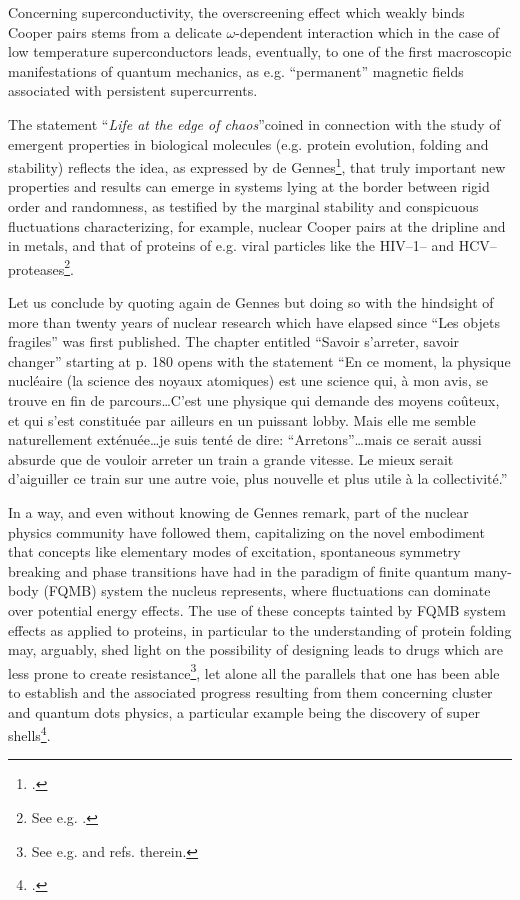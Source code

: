 Concerning superconductivity, the overscreening effect which  weakly binds Cooper pairs stems from a delicate $\omega$-dependent interaction which in the case of low temperature superconductors leads, eventually, to one of the first macroscopic manifestations of quantum mechanics, as e.g. ``permanent'' magnetic fields associated with persistent  supercurrents.

The statement ``\textit{Life at the edge of chaos}''coined in connection with the study of emergent properties in biological molecules (e.g. protein evolution, folding and stability) reflects the idea, as expressed by de Gennes\footnote{\cite{DeGennes:94}.}, that truly important new properties and results can emerge in systems lying at the border between rigid order and randomness, as testified by the marginal stability and conspicuous fluctuations characterizing, for example, nuclear Cooper pairs at the dripline and in metals, and that of proteins of e.g.  viral particles like the HIV--1-- and HCV--proteases\footnote{See e.g. \cite{Broglia:13b}.}.


 Let us conclude by quoting again de Gennes but doing so with the hindsight of more than twenty years of nuclear research which have elapsed since ``Les objets fragiles'' was first published. The chapter entitled  ``Savoir s'arreter, savoir changer'' starting at p. 180 opens with the statement ``En ce moment, la physique nucl\'eaire (la science des noyaux atomiques) est une science qui, \`a mon avis, se trouve en fin de parcours\dots C'est une physique qui demande des moyens co\^uteux, et qui s'est constitu\'ee par ailleurs en un puissant lobby. Mais elle me semble naturellement ext\'enu\'ee\dots je suis tent\'e de dire: ``Arretons''\dots mais ce serait aussi absurde que de vouloir arreter un train a grande vitesse. Le mieux serait d'aiguiller ce train sur une autre voie, plus nouvelle et plus utile \`a la collectivit\'e.''


In a way, and even without knowing de Gennes remark, part of the nuclear physics community have followed them, capitalizing on the novel embodiment that concepts like elementary modes of excitation, spontaneous symmetry breaking and phase transitions have had in the paradigm of finite quantum many-body (FQMB) system the nucleus represents, where fluctuations can dominate over potential energy effects. The use of these concepts tainted by  FQMB system effects as applied to proteins, in particular to the understanding of protein folding may, arguably, shed light on the possibility of designing leads to  drugs which are less prone to create resistance\footnote{See e.g. \cite{Broglia:05,Rosner:17} and refs. therein.}, let alone all the parallels that one has been able to establish and the associated progress resulting from them concerning cluster and quantum dots physics, a particular example being the discovery of super shells\footnote{\cite{Pedersen:91,deHeer:87,Brack:93,Pacheco:91,Lipparini:03,Martin:94,Bjornholm:94}.}.







